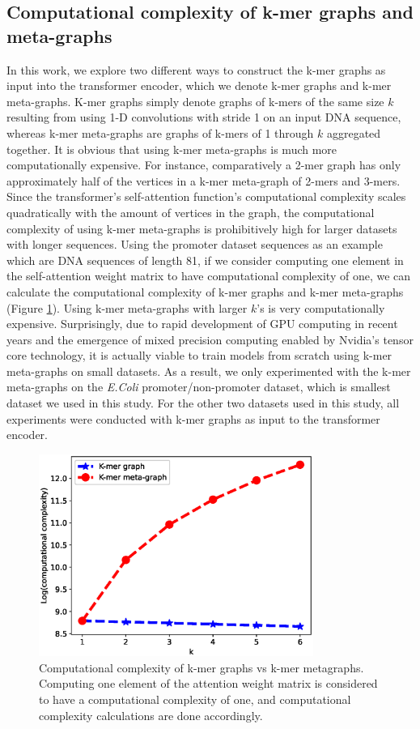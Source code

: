 \documentclass{article}
\begin{document}
\subsection{Computational complexity of k-mer graphs and meta-graphs}
In this work, we explore two different ways to construct the k-mer graphs as input into the transformer encoder, which we denote k-mer graphs and k-mer meta-graphs. K-mer graphs simply denote graphs of k-mers of the same size $k$ resulting from using 1-D convolutions with stride 1 on an input DNA sequence, whereas k-mer meta-graphs are graphs of k-mers of 1 through $k$ aggregated together. It is obvious that using k-mer meta-graphs is much more computationally expensive. For instance, comparatively a 2-mer graph has only approximately half of the vertices in a k-mer meta-graph of 2-mers and 3-mers. Since the transformer's self-attention function's computational complexity scales quadratically with the amount of vertices in the graph, the computational complexity of using k-mer meta-graphs is prohibitively high for larger datasets with longer sequences. Using the promoter dataset sequences as an example which are DNA sequences of length 81, if we consider computing one element in the self-attention weight matrix to have computational complexity of one, we can calculate the computational complexity of k-mer graphs and k-mer meta-graphs (Figure \ref{fig:graph complexity}). Using k-mer meta-graphs with larger $k$'s is very computationally expensive. Surprisingly, due to rapid development of GPU computing in recent years and the emergence of mixed precision computing enabled by Nvidia's tensor core technology, it is actually viable to train models from scratch using k-mer meta-graphs on small datasets. As a result, we only experimented with the k-mer meta-graphs on the \textit{E.Coli} promoter/non-promoter dataset, which is smallest dataset we used in this study. For the other two datasets used in this study, all experiments were conducted with k-mer graphs as input to the transformer encoder. 

\begin{figure}[H]
\center
\includegraphics[width=0.8\textwidth]{graph_metagraph_complexity.eps}
%
\caption{Computational complexity of k-mer graphs vs k-mer metagraphs. Computing one element of the attention weight matrix is considered to have a computational complexity of one, and computational complexity calculations are done accordingly. }
\label{fig:graph complexity}
\end{figure}
\end{document}
